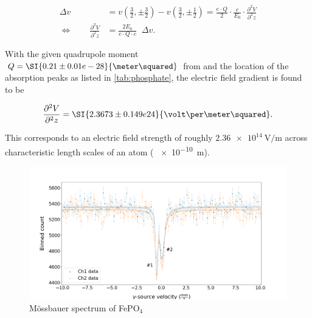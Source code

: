 \begin{align*}
\Delta v &= v(\frac{3}{2},\pm\frac{3}{2}) - v(\frac{3}{2},\pm\frac{1}{2}) = \frac{e\cdot Q}{2}\cdot\frac{c}{E_0}\cdot\frac{\partial^2 V}{\partial^2 z} \\
\Leftrightarrow\qquad\frac{\partial^2 V}{\partial^2 z} &= \frac{2E_0}{e\cdot Q\cdot c}\;\;\Delta v.
\end{align*}

With the given quadrupole moment $Q=\SI{0.21\pm0.01e-28}{\meter\squared}$ from 
\cite{Sch17}and the location of the absorption peaks as listed in 
\autoref{tab:phosphate}, the electric field gradient is found to be

\begin{equation}
\label{eq:field-gradient}
\frac{\partial^2 V}{\partial^2 z} = \SI{2.3673\pm0.149e24}{\volt\per\meter\squared}.
\end{equation}

This corresponds to an electric field strength of roughly 
$\SI{2.36e14}{\volt\per\meter}$ across characteristic length scales of an atom (
\SI{e-10}{\meter}).

\begin{figure}
	\label{fig:phosphate}
	\includegraphics[width=1.0\textwidth]{./fig/Phosphate.png}
	\caption{Mössbauer spectrum of FePO$_4$}{}
\end{figure}


